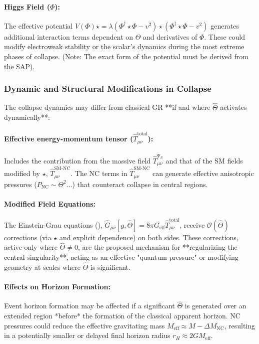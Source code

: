 \documentclass[11pt, a4paper]{article}
\theoremstyle{remark}
\newcommand{\Op}[1]{\hat{#1}}
\begin{document}
\paragraph{Higgs Field (\( \Phi \)):} The effective potential \( V(\Phi) \star = \lambda ( \Phi^\dagger \star \Phi - v^2 ) \star ( \Phi^\dagger \star \Phi - v^2 ) \) generates additional interaction terms dependent on \( \Theta \) and derivatives of \( \Phi \). These could modify electroweak stability or the scalar's dynamics during the most extreme phases of collapse. (Note: The exact form of the potential must be derived from the SAP).

\subsubsection{Dynamic and Structural Modifications in Collapse}
\label{ssubsec:dynamic_mods_collapse}

The collapse dynamics may differ from classical GR **if and where \( \Op{\Theta} \) activates dynamically**:

\paragraph{Effective energy-momentum tensor (\( \hat{T}_{\mu\nu}^{\text{total}} \)):} Includes the contribution from the massive field \( \hat{T}_{\mu\nu}^{\Psi_N} \) and that of the SM fields modified by \( \star \), \( \hat{T}_{\mu\nu}^{\text{SM-NC}} \). The NC terms in \( \hat{T}_{\mu\nu}^{\text{SM-NC}} \) can generate effective anisotropic pressures (\( P_{\text{NC}} \sim \Theta^2 \dots \)) that counteract collapse in central regions.

\paragraph{Modified Field Equations:} The Einstein-Grau equations (), \( \Op{G}_{\mu\nu}[g, \hat{\Theta}] = 8\pi G_{\text{eff}} \Op{T}_{\mu\nu}^{\text{total}} \), receive \( \mathcal{O}(\Op{\Theta}) \) corrections (via \( \star \) and explicit dependence) on both sides. These corrections, active only where \( \Op{\Theta} \neq 0 \), are the proposed mechanism for **regularizing the central singularity**, acting as an effective "quantum pressure" or modifying geometry at scales where \( \Op{\Theta} \) is significant.

\paragraph{Effects on Horizon Formation:} Event horizon formation may be affected if a significant \( \Op{\Theta} \) is generated over an extended region *before* the formation of the classical apparent horizon. NC pressures could reduce the effective gravitating mass \( M_{\text{eff}} \approx M - \Delta M_{\text{NC}} \), resulting in a potentially smaller or delayed final horizon radius \( r_H \approx 2 G M_{\text{eff}} \).
\end{document}
